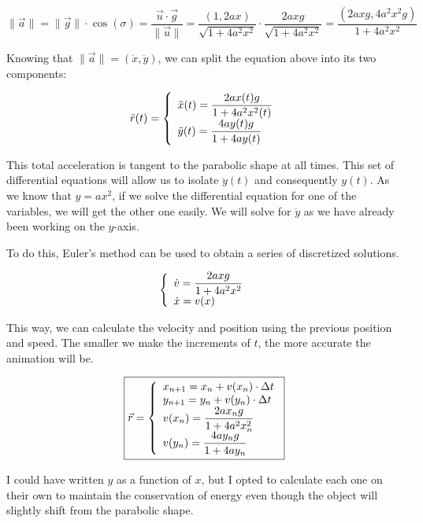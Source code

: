 \documentclass[12pt,twoside,a4paper]{article}
\newcommand{\ds}{\displaystyle}
\begin{document}
	$$\|\vec{a}\| = \|\vec{g}\| \cdot \cos(\sigma) = \frac{\vec{u} \cdot \vec{g}}{\|\vec{u}\|} = \frac{\left(1, 2ax\right)}{\sqrt{1 + 4a^2x^2}} \cdot \frac{2axg}{\sqrt{1 + 4a^2x^2}} = \frac{\left(2axg, 4a^2x^2g\right)}{1 + 4a^2x^2}$$
	
	Knowing that $\|\vec{a}\| = (\ddot{x}, \ddot{y})$, we can split the equation above into its two components:
	
	$$\ddot{r}(t) = \left\{\begin{array}{l} \ds \ddot{x}(t) = \frac{2ax(t)g}{1 + 4a^2x^2(t)} \cr \ds \ddot{y}(t) = \frac{4ay(t)g}{1 + 4ay(t)} \end{array}\right.$$
	
	This total acceleration is tangent to the parabolic shape at all times. This set of differential equations will allow us to isolate $\ddot y(t)$ and consequently $y(t)$. As we know that $y = ax^2$, if we solve the differential equation for one of the variables, we will get the other one easily. We will solve for $\ddot y$ as we have already been working on the $y$-axis.
	
	To do this, Euler's method can be used to obtain a series of discretized solutions.
	
	$$\left\{\begin{array}{l} \ds \dot v = \frac{2axg}{1 + 4a^2x^2} \cr \dot x = v(x) \end{array}\right.$$
	
	This way, we can calculate the velocity and position using the previous position and speed. The smaller we make the increments of $t$, the more accurate the animation will be.
	
	$$\boxed{\vec{r} = \left\{\begin{array}{l} \ds x_{n+1} = x_n + v(x_n) \cdot \Delta t \cr \ds y_{n+1} = y_n + v(y_n) \cdot \Delta t \cr \ds v(x_n) = \frac{2ax_ng}{1 + 4a^2x^2_n} \cr \ds v(y_n) = \frac{4ay_ng}{1 + 4ay_n} \end{array}\right.}$$
	
	I could have written $y$ as a function of $x$, but I opted to calculate each one on their own to maintain the conservation of energy even though the object will slightly shift from the parabolic shape.
	
	\newpage
	
\end{document}
